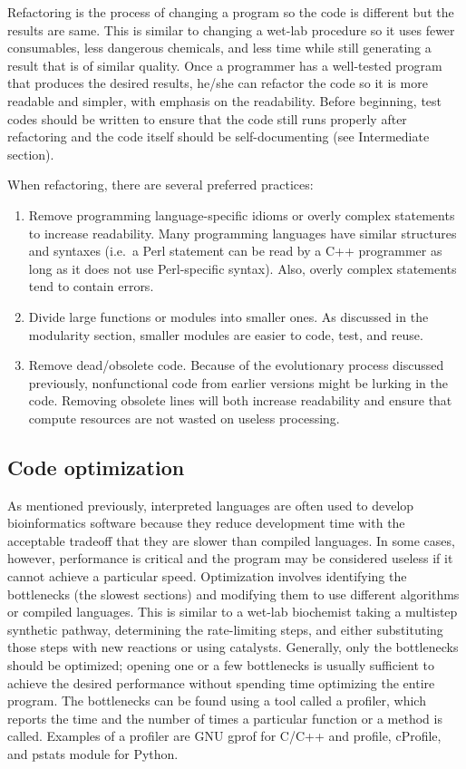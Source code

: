 \documentclass[ChapterTOCs,krantz2]{krantz} %
\begin{document}
Refactoring is the process of changing a program so the code is different but
the results are same.  This is similar to changing a wet-lab procedure  
so it uses fewer consumables, less dangerous chemicals, and less time while still
generating a result that is of similar quality.  Once a programmer has a
well-tested program that produces the desired results, he/she can refactor the
code so it is more readable and simpler, with emphasis on the readability.
Before beginning, test codes should be written to ensure that the code still
runs properly after refactoring and the code itself should be self-documenting
(see Intermediate section). 

When refactoring, there are several preferred practices:  
\begin{enumerate}

\item Remove programming
language-specific idioms or overly complex statements to increase readability.
Many programming languages have similar structures and syntaxes (i.e.\ a Perl
statement can be read by a C++ programmer as long as it does not
use Perl-specific syntax).  Also, overly complex statements 
tend to contain errors.  

\item Divide large
functions or modules into smaller ones.  As discussed in the
modularity section, smaller modules are easier to code, test, and reuse.  

\item Remove dead/obsolete code.  Because of the evolutionary process 
discussed previously,
nonfunctional code from earlier versions might be lurking in the code.
Removing obsolete lines will both increase readability and ensure that compute
resources are not wasted on useless processing.
\end{enumerate}

\subsection{Code optimization}

As mentioned previously, interpreted
languages are often used to develop bioinformatics software because they
reduce development time with the acceptable tradeoff that they are
slower than compiled languages. In some cases, however, performance is critical
and the program may be considered useless if it cannot achieve a particular
speed.  
Optimization involves identifying the bottlenecks (the slowest
sections) and modifying them to use different algorithms or
compiled languages.  This is similar to a wet-lab biochemist taking a multistep
synthetic pathway, determining the rate-limiting steps, and either
substituting those steps with new reactions or using catalysts.  Generally, 
only the
bottlenecks should be optimized; opening one or a few bottlenecks is usually
sufficient to achieve the desired performance without spending time optimizing
the entire program.  The bottlenecks can be found using a tool called a profiler,
which reports the time and the number of times a particular
function or a method is called.
Examples of a profiler are GNU gprof for C/C++ and profile,
cProfile, and pstats module for Python.
\end{document}
